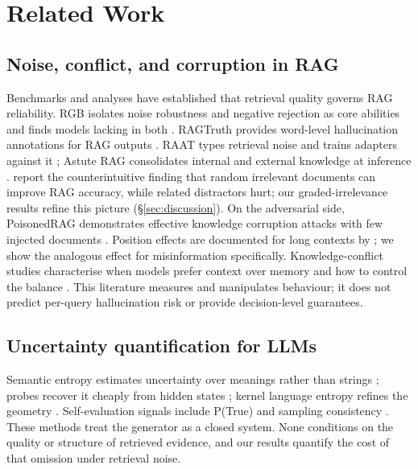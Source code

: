 \documentclass[11pt]{article}
\begin{document}
\section{Related Work}\label{sec:related}

\subsection{Noise, conflict, and corruption in RAG}
Benchmarks and analyses have established that retrieval quality governs
RAG reliability. RGB isolates noise robustness and negative rejection
as core abilities and finds models lacking in both
\citep{chen2023rgb}. RAGTruth provides word-level hallucination
annotations for RAG outputs \citep{wu2024ragtruth}. RAAT types
retrieval noise and trains adapters against it \citep{fang2024raat};
Astute RAG consolidates internal and external knowledge at inference
\citep{wang2024astuterag}. \citet{cuconasu2024power} report the
counterintuitive finding that random irrelevant documents can improve
RAG accuracy, while related distractors hurt; our graded-irrelevance
results refine this picture (\S\ref{sec:discussion}). On the
adversarial side, PoisonedRAG demonstrates effective knowledge
corruption attacks with few injected documents
\citep{zou2025poisonedrag}. Position effects are documented for long
contexts by \citet{liu2024lost}; we show the analogous effect for
misinformation specifically. Knowledge-conflict studies characterise
when models prefer context over memory
\citep{xie2024adaptive,kortukov2024conflicts,xu2024survey} and how to
control the balance \citep{bi2025ckplug,zhang2024knowpo}. This
literature measures and manipulates behaviour; it does not predict
per-query hallucination risk or provide decision-level guarantees.

\subsection{Uncertainty quantification for LLMs}
Semantic entropy estimates uncertainty over meanings rather than
strings \citep{kuhn2023semantic,farquhar2024nature}; probes recover it
cheaply from hidden states \citep{kossen2024sep}; kernel language
entropy refines the geometry \citep{nikitin2024kle}. Self-evaluation
signals include P(True) \citep{kadavath2022language} and sampling
consistency \citep{manakul2023selfcheckgpt}. These methods treat the
generator as a closed system. None conditions on the quality or
structure of retrieved evidence, and our results quantify the cost of
that omission under retrieval noise.
\end{document}
